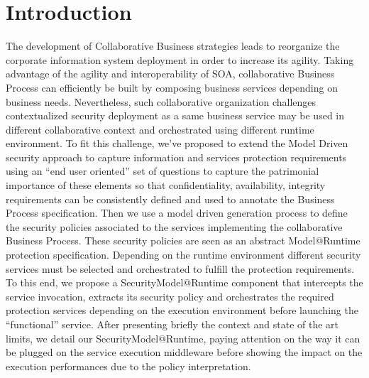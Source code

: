 \documentclass[runningheads,a4paper]{llncs}
\begin{document}
\section{Introduction}
The development of Collaborative Business strategies leads to reorganize the corporate information system deployment in order to increase its agility. Taking advantage of the agility and interoperability of SOA, collaborative Business Process can efficiently be built by composing business services depending on business needs. Nevertheless, such collaborative organization challenges contextualized security deployment as a same business service may be used in different collaborative context and orchestrated using different runtime environment.
To fit this challenge, we've proposed to extend the Model Driven security approach to capture information and services protection requirements using an “end user oriented” set of questions to capture the patrimonial importance of these elements so that confidentiality, availability, integrity requirements can be consistently defined and used to annotate the Business Process specification. Then we use a model driven generation process to define the security policies associated to the services implementing the collaborative Business Process.
These security policies are seen as an abstract Model@Runtime protection specification. Depending on the runtime environment different security services must be selected and orchestrated to fulfill the protection requirements. To this end, we propose a SecurityModel@Runtime component that intercepts the service invocation, extracts its security policy and orchestrates the required protection services depending on the execution environment before launching the “functional” service. 
After presenting briefly the context and state of the art limits, we detail our SecurityModel@Runtime, paying attention on the way it can be plugged on the service execution middleware before showing the impact on the execution performances due to the policy interpretation.
\end{document}
